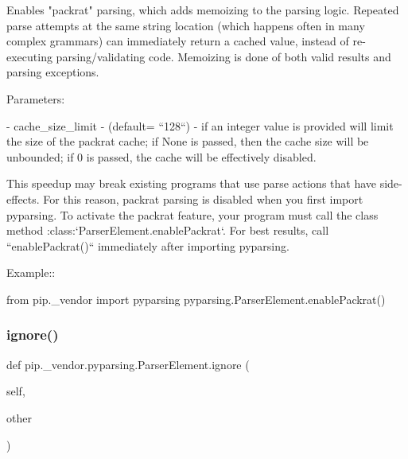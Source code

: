 \begin{DoxyVerb}Enables "packrat" parsing, which adds memoizing to the parsing logic.
   Repeated parse attempts at the same string location (which happens
   often in many complex grammars) can immediately return a cached value,
   instead of re-executing parsing/validating code.  Memoizing is done of
   both valid results and parsing exceptions.

   Parameters:

   - cache_size_limit - (default= ``128``) - if an integer value is provided
     will limit the size of the packrat cache; if None is passed, then
     the cache size will be unbounded; if 0 is passed, the cache will
     be effectively disabled.

   This speedup may break existing programs that use parse actions that
   have side-effects.  For this reason, packrat parsing is disabled when
   you first import pyparsing.  To activate the packrat feature, your
   program must call the class method :class:`ParserElement.enablePackrat`.
   For best results, call ``enablePackrat()`` immediately after
   importing pyparsing.

   Example::

       from pip._vendor import pyparsing
       pyparsing.ParserElement.enablePackrat()
\end{DoxyVerb}
 \mbox{\label{classpip_1_1__vendor_1_1pyparsing_1_1ParserElement_ade9a209a0e02b223cb330dd33b1618a8}} 
\subsubsection{\texorpdfstring{ignore()}{ignore()}}
{\footnotesize\ttfamily def pip.\+\_\+vendor.\+pyparsing.\+Parser\+Element.\+ignore (\begin{DoxyParamCaption}\item[{}]{self,  }\item[{}]{other }\end{DoxyParamCaption})}

